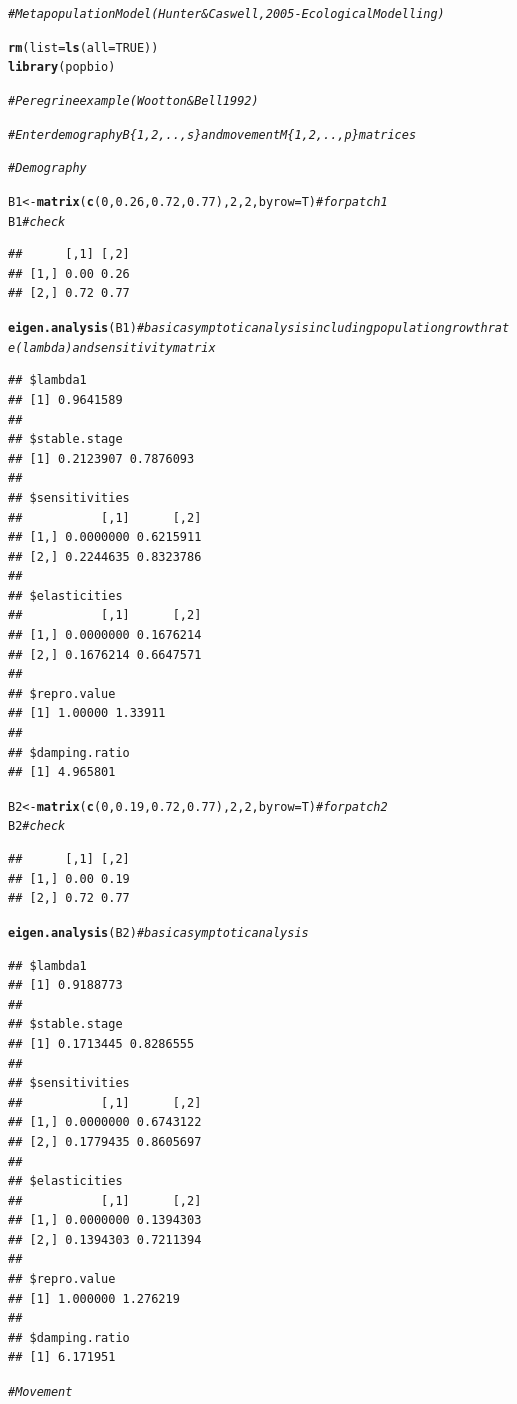 \documentclass{article}\usepackage[]{graphicx}\usepackage[]{color}
\makeatletter
\newcommand{\hlnum}[1]{\textcolor[rgb]{0.686,0.059,0.569}{#1}}%
\newcommand{\hlcom}[1]{\textcolor[rgb]{0.678,0.584,0.686}{\textit{#1}}}%
\newcommand{\hlstd}[1]{\textcolor[rgb]{0.345,0.345,0.345}{#1}}%
\newcommand{\hlkwb}[1]{\textcolor[rgb]{0.69,0.353,0.396}{#1}}%
\newcommand{\hlkwc}[1]{\textcolor[rgb]{0.333,0.667,0.333}{#1}}%
\newcommand{\hlkwd}[1]{\textcolor[rgb]{0.737,0.353,0.396}{\textbf{#1}}}%
\newenvironment{kframe}{%
 \def\at@end@of@kframe{}%
 \ifinner\ifhmode%
  \def\at@end@of@kframe{\end{minipage}}%
  \begin{minipage}{\columnwidth}%
 \fi\fi%
 \def\FrameCommand##1{\hskip\@totalleftmargin \hskip-\fboxsep
 \colorbox{shadecolor}{##1}\hskip-\fboxsep
     \hskip-\linewidth \hskip-\@totalleftmargin \hskip\columnwidth}%
 \MakeFramed {\advance\hsize-\width
   \@totalleftmargin\z@ \linewidth\hsize
   \@setminipage}}%
 {\par\unskip\endMakeFramed%
 \at@end@of@kframe}
\newenvironment{knitrout}{}{} %
\makeatother
\begin{document}
\begin{knitrout}
\color{fgcolor}\begin{kframe}
\begin{alltt}
\hlcom{# Metapopulation Model (Hunter & Caswell, 2005 - Ecological Modelling)}

\hlkwd{rm}\hlstd{(}\hlkwc{list}\hlstd{=}\hlkwd{ls}\hlstd{(}\hlkwc{all}\hlstd{=}\hlnum{TRUE}\hlstd{))}
\hlkwd{library}\hlstd{(popbio)}


\hlcom{# Peregrine example (Wootton & Bell 1992)}


\hlcom{# Enter demography B\{1,2,..,s\} and movement M\{1,2,..,p\} matrices}

\hlcom{# Demography}

\hlstd{B1}\hlkwb{<-}\hlkwd{matrix}\hlstd{(}\hlkwd{c}\hlstd{(}\hlnum{0}\hlstd{,}\hlnum{0.26}\hlstd{,}\hlnum{0.72}\hlstd{,}\hlnum{0.77}\hlstd{),}\hlnum{2}\hlstd{,}\hlnum{2}\hlstd{,}\hlkwc{byrow}\hlstd{=T)}    \hlcom{# for patch 1}
\hlstd{B1} \hlcom{#check}
\end{alltt}
\begin{verbatim}
##      [,1] [,2]
## [1,] 0.00 0.26
## [2,] 0.72 0.77
\end{verbatim}
\begin{alltt}
\hlkwd{eigen.analysis}\hlstd{(B1)} \hlcom{# basic asymptotic analysis including population growth rate (lambda) and sensitivity matrix}
\end{alltt}
\begin{verbatim}
## $lambda1
## [1] 0.9641589
## 
## $stable.stage
## [1] 0.2123907 0.7876093
## 
## $sensitivities
##           [,1]      [,2]
## [1,] 0.0000000 0.6215911
## [2,] 0.2244635 0.8323786
## 
## $elasticities
##           [,1]      [,2]
## [1,] 0.0000000 0.1676214
## [2,] 0.1676214 0.6647571
## 
## $repro.value
## [1] 1.00000 1.33911
## 
## $damping.ratio
## [1] 4.965801
\end{verbatim}
\begin{alltt}
\hlstd{B2}\hlkwb{<-}\hlkwd{matrix}\hlstd{(}\hlkwd{c}\hlstd{(}\hlnum{0}\hlstd{,}\hlnum{0.19}\hlstd{,}\hlnum{0.72}\hlstd{,}\hlnum{0.77}\hlstd{),}\hlnum{2}\hlstd{,}\hlnum{2}\hlstd{,}\hlkwc{byrow}\hlstd{=T)}        \hlcom{# for patch 2}
\hlstd{B2}  \hlcom{#check}
\end{alltt}
\begin{verbatim}
##      [,1] [,2]
## [1,] 0.00 0.19
## [2,] 0.72 0.77
\end{verbatim}
\begin{alltt}
\hlkwd{eigen.analysis}\hlstd{(B2)} \hlcom{# basic asymptotic analysis}
\end{alltt}
\begin{verbatim}
## $lambda1
## [1] 0.9188773
## 
## $stable.stage
## [1] 0.1713445 0.8286555
## 
## $sensitivities
##           [,1]      [,2]
## [1,] 0.0000000 0.6743122
## [2,] 0.1779435 0.8605697
## 
## $elasticities
##           [,1]      [,2]
## [1,] 0.0000000 0.1394303
## [2,] 0.1394303 0.7211394
## 
## $repro.value
## [1] 1.000000 1.276219
## 
## $damping.ratio
## [1] 6.171951
\end{verbatim}
\begin{alltt}
\hlcom{# Movement}


\end{alltt}
\end{kframe}
\end{knitrout}
\end{document}
